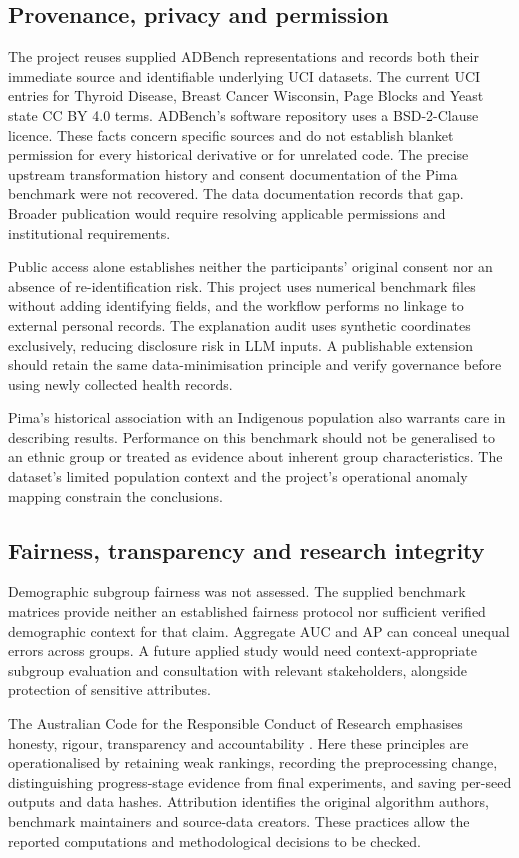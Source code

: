 \documentclass[11pt]{article}
\begin{document}
\subsection{Provenance, privacy and permission}
The project reuses supplied ADBench representations and records both their immediate source and identifiable underlying UCI datasets. The current UCI entries for Thyroid Disease, Breast Cancer Wisconsin, Page Blocks and Yeast state CC BY 4.0 terms. ADBench's software repository uses a BSD-2-Clause licence. These facts concern specific sources and do not establish blanket permission for every historical derivative or for unrelated code. The precise upstream transformation history and consent documentation of the Pima benchmark were not recovered. The data documentation records that gap. Broader publication would require resolving applicable permissions and institutional requirements.

Public access alone establishes neither the participants' original consent nor an absence of re-identification risk. This project uses numerical benchmark files without adding identifying fields, and the workflow performs no linkage to external personal records. The explanation audit uses synthetic coordinates exclusively, reducing disclosure risk in LLM inputs. A publishable extension should retain the same data-minimisation principle and verify governance before using newly collected health records.

Pima's historical association with an Indigenous population also warrants care in describing results. Performance on this benchmark should not be generalised to an ethnic group or treated as evidence about inherent group characteristics. The dataset's limited population context and the project's operational anomaly mapping constrain the conclusions.

\subsection{Fairness, transparency and research integrity}
Demographic subgroup fairness was not assessed. The supplied benchmark matrices provide neither an established fairness protocol nor sufficient verified demographic context for that claim. Aggregate AUC and AP can conceal unequal errors across groups. A future applied study would need context-appropriate subgroup evaluation and consultation with relevant stakeholders, alongside protection of sensitive attributes.

The Australian Code for the Responsible Conduct of Research emphasises honesty, rigour, transparency and accountability \citep{nhmrc2018code}. Here these principles are operationalised by retaining weak rankings, recording the preprocessing change, distinguishing progress-stage evidence from final experiments, and saving per-seed outputs and data hashes. Attribution identifies the original algorithm authors, benchmark maintainers and source-data creators. These practices allow the reported computations and methodological decisions to be checked.
\end{document}
